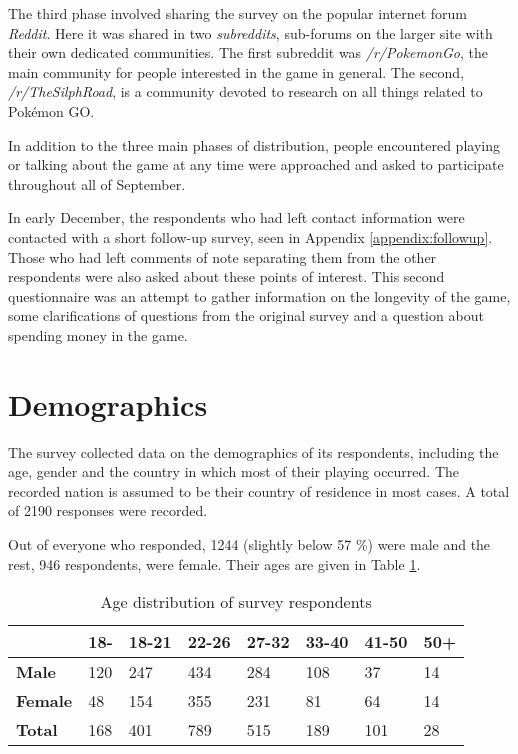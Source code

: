 The third phase involved sharing the survey on the popular internet forum \emph{Reddit}. Here it was shared in two \emph{subreddits}, sub-forums on the larger site with their own dedicated communities. The first subreddit was \emph{/r/PokemonGo}, the main community for people interested in the game in general. The second, \emph{/r/TheSilphRoad}, is a community devoted to research on all things related to Pokémon GO.

In addition to the three main phases of distribution, people encountered playing or talking about the game at any time were approached and asked to participate throughout all of September.

In early December, the respondents who had left contact information were contacted with a short follow-up survey, seen in Appendix \ref{appendix:followup}. Those who had left comments of note separating them from the other respondents were also asked about these points of interest. This second questionnaire was an attempt to gather information on the longevity of the game, some clarifications of questions from the original survey and a question about spending money in the game. 


\section{Demographics}

The survey collected data on the demographics of its respondents, including the age, gender and the country in which most of their playing occurred. The recorded nation is assumed to be their country of residence in most cases. A total of 2190 responses were recorded.

Out of everyone who responded, 1244 (slightly below 57 \%) were male and the rest, 946 respondents, were female. Their ages are given in Table \ref{tbl:survey-age-distribution}.

\begin{table}[h]
	\centering
	\caption{Age distribution of survey respondents}
	\label{tbl:survey-age-distribution}
	\begin{tabularx}{\textwidth}{|X||X|X|X|X|X|X|X|}
		\hline
		&\textbf{18-} & \textbf{18-21} & \textbf{22-26} & \textbf{27-32} & \textbf{33-40} & \textbf{41-50} & \textbf{50+}\\
		\hline\hline
		
		\textbf{Male} & 120 & 247 & 434 & 284 & 108 & 37 & 14 \\
		\hline
		
		\textbf{Female} & 48 & 154 & 355 & 231 & 81 & 64 & 14 \\
		\hline
		
		\textbf{Total} & 168 & 401 & 789 & 515 & 189 & 101 & 28 \\
		\hline
	\end{tabularx}
\end{table}

